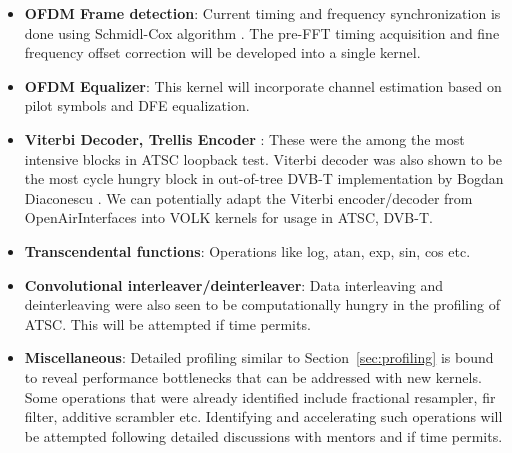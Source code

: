 \documentclass[a4paper,12pt,oneside]{article}
\begin{document}
\begin{itemize}
\item \textbf{OFDM Frame detection}: Current timing and frequency synchronization is done using Schmidl-Cox algorithm \cite{schmidl-cox}. The pre-FFT timing acquisition and fine frequency offset correction will be developed into a single kernel.
\item \textbf{OFDM Equalizer}: This kernel will incorporate channel estimation based on pilot symbols and DFE equalization.
\item \textbf{Viterbi Decoder, Trellis Encoder} : These were the among the most intensive blocks in ATSC loopback test. Viterbi decoder was also shown to be the most cycle hungry block in out-of-tree DVB-T implementation by Bogdan Diaconescu \cite{dvbt}. We can potentially adapt the Viterbi encoder/decoder from OpenAirInterfaces into VOLK kernels for usage in ATSC, DVB-T.
\item \textbf{Transcendental functions}: Operations like log, atan, exp, sin, cos etc.
\item \textbf{Convolutional interleaver/deinterleaver}: Data interleaving and deinterleaving were also seen to be computationally hungry in the profiling of ATSC. This will be attempted if time permits. 
\item \textbf{Miscellaneous}: Detailed profiling similar to Section~\ref{sec:profiling} is bound to reveal performance bottlenecks that can be addressed with new kernels. Some operations that were already identified include fractional resampler, fir filter, additive scrambler etc. Identifying and accelerating such operations will be attempted following detailed discussions with mentors and if time permits.
\end{itemize}
\end{document}
